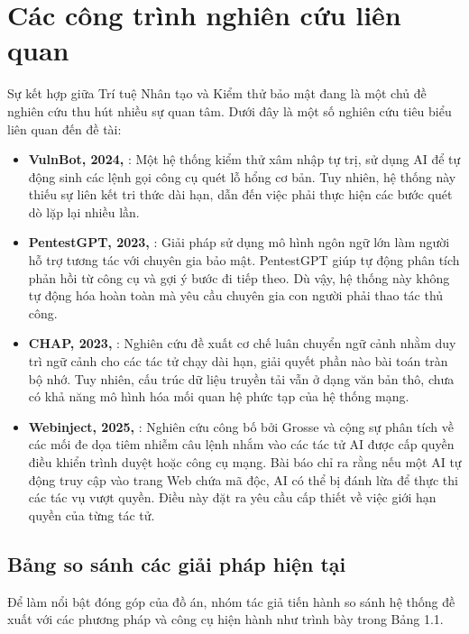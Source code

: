 \section{Các công trình nghiên cứu liên quan}
Sự kết hợp giữa Trí tuệ Nhân tạo và Kiểm thử bảo mật đang là một chủ đề nghiên cứu thu hút nhiều sự quan tâm. Dưới đây là một số nghiên cứu tiêu biểu liên quan đến đề tài:

\begin{itemize}
    \item \textbf{VulnBot, 2024,} \cite{vulnbot2024}: Một hệ thống kiểm thử xâm nhập tự trị, sử dụng AI để tự động sinh các lệnh gọi công cụ quét lỗ hổng cơ bản. Tuy nhiên, hệ thống này thiếu sự liên kết tri thức dài hạn, dẫn đến việc phải thực hiện các bước quét dò lặp lại nhiều lần.
    \item \textbf{PentestGPT, 2023,} \cite{pentestgpt2023}: Giải pháp sử dụng mô hình ngôn ngữ lớn làm người hỗ trợ tương tác với chuyên gia bảo mật. PentestGPT giúp tự động phân tích phản hồi từ công cụ và gợi ý bước đi tiếp theo. Dù vậy, hệ thống này không tự động hóa hoàn toàn mà yêu cầu chuyên gia con người phải thao tác thủ công.
    \item \textbf{CHAP, 2023,} \cite{chap2023}: Nghiên cứu đề xuất cơ chế luân chuyển ngữ cảnh nhằm duy trì ngữ cảnh cho các tác tử chạy dài hạn, giải quyết phần nào bài toán tràn bộ nhớ. Tuy nhiên, cấu trúc dữ liệu truyền tải vẫn ở dạng văn bản thô, chưa có khả năng mô hình hóa mối quan hệ phức tạp của hệ thống mạng.
    \item \textbf{Webinject, 2025,} \cite{promptinject2025}: Nghiên cứu công bố bởi Grosse và cộng sự phân tích về các mối đe dọa tiêm nhiễm câu lệnh nhắm vào các tác tử AI được cấp quyền điều khiển trình duyệt hoặc công cụ mạng. Bài báo chỉ ra rằng nếu một AI tự động truy cập vào trang Web chứa mã độc, AI có thể bị đánh lừa để thực thi các tác vụ vượt quyền. Điều này đặt ra yêu cầu cấp thiết về việc giới hạn quyền của từng tác tử.
\end{itemize}

\subsection{Bảng so sánh các giải pháp hiện tại}
Để làm nổi bật đóng góp của đồ án, nhóm tác giả tiến hành so sánh hệ thống đề xuất với các phương pháp và công cụ hiện hành như trình bày trong Bảng 1.1.


